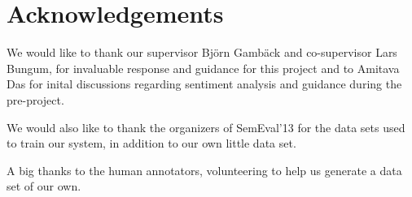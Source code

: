 \section*{Acknowledgements}

We would like to thank our supervisor Bj\"{o}rn Gamb\"{a}ck and co-supervisor Lars Bungum, for invaluable response and guidance for this project and to Amitava Das for inital discussions regarding sentiment analysis and guidance during the pre-project.

We would also like to thank the organizers of SemEval’13 for the data sets used to train our system, in addition to our own little data set. 

A big thanks to the human annotators, volunteering to help us generate a data set of our own.  

\cleardoublepage